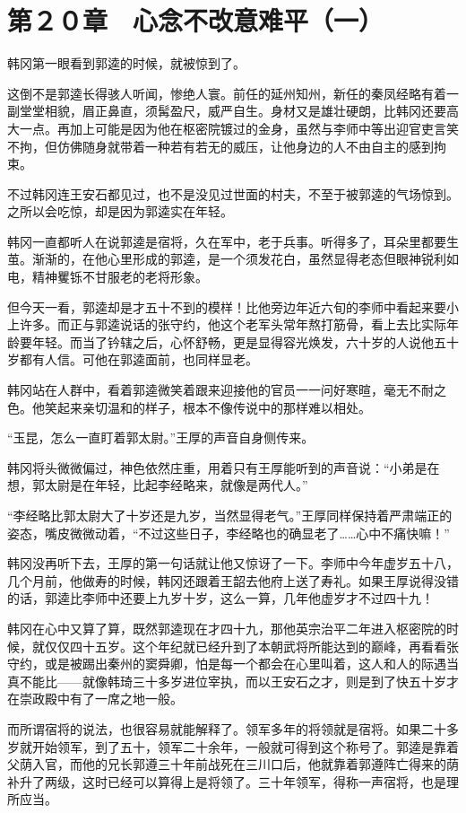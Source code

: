 \section{第２０章　心念不改意难平（一）}

韩冈第一眼看到郭逵的时候，就被惊到了。

这倒不是郭逵长得骇人听闻，惨绝人寰。前任的延州知州，新任的秦凤经略有着一副堂堂相貌，眉正鼻直，须髯盈尺，威严自生。身材又是雄壮硬朗，比韩冈还要高大一点。再加上可能是因为他在枢密院镀过的金身，虽然与李师中等出迎官吏言笑不拘，但仿佛随身就带着一种若有若无的威压，让他身边的人不由自主的感到拘束。

不过韩冈连王安石都见过，也不是没见过世面的村夫，不至于被郭逵的气场惊到。之所以会吃惊，却是因为郭逵实在年轻。

韩冈一直都听人在说郭逵是宿将，久在军中，老于兵事。听得多了，耳朵里都要生茧。渐渐的，在他心里形成的郭逵，是一个须发花白，虽然显得老态但眼神锐利如电，精神矍铄不甘服老的老将形象。

但今天一看，郭逵却是才五十不到的模样！比他旁边年近六旬的李师中看起来要小上许多。而正与郭逵说话的张守约，他这个老军头常年熬打筋骨，看上去比实际年龄要年轻。而当了钤辖之后，心怀舒畅，更是显得容光焕发，六十岁的人说他五十岁都有人信。可他在郭逵面前，也同样显老。

韩冈站在人群中，看着郭逵微笑着跟来迎接他的官员一一问好寒暄，毫无不耐之色。他笑起来亲切温和的样子，根本不像传说中的那样难以相处。

“玉昆，怎么一直盯着郭太尉。”王厚的声音自身侧传来。

韩冈将头微微偏过，神色依然庄重，用着只有王厚能听到的声音说：“小弟是在想，郭太尉是在年轻，比起李经略来，就像是两代人。”

“李经略比郭太尉大了十岁还是九岁，当然显得老气。”王厚同样保持着严肃端正的姿态，嘴皮微微动着，“不过这些日子，李经略也的确显老了……心中不痛快嘛！”

韩冈没再听下去，王厚的第一句话就让他又惊讶了一下。李师中今年虚岁五十八，几个月前，他做寿的时候，韩冈还跟着王韶去他府上送了寿礼。如果王厚说得没错的话，郭逵比李师中还要上九岁十岁，这么一算，几年他虚岁才不过四十九！

韩冈在心中又算了算，既然郭逵现在才四十九，那他英宗治平二年进入枢密院的时候，就仅仅四十五岁。这个年纪就已经升到了本朝武将所能达到的巅峰，再看看张守约，或是被踢出秦州的窦舜卿，怕是每一个都会在心里叫着，这人和人的际遇当真不能比——就像韩琦三十多岁进位宰执，而以王安石之才，则是到了快五十岁才在崇政殿中有了一席之地一般。

而所谓宿将的说法，也很容易就能解释了。领军多年的将领就是宿将。如果二十多岁就开始领军，到了五十，领军二十余年，一般就可得到这个称号了。郭逵是靠着父荫入官，而他的兄长郭遵三十年前战死在三川口后，他就靠着郭遵阵亡得来的荫补升了两级，这时已经可以算得上是将领了。三十年领军，得称一声宿将，也是理所应当。


